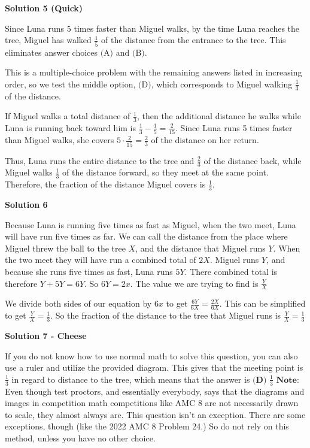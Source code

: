 \begin{enumerate}
 



\textbf{Solution 5 (Quick)}

Since Luna runs 5 times faster than Miguel walks, by the time Luna reaches the tree, Miguel has walked $\frac{1}{5}$ of the distance from the entrance to the tree. This eliminates answer choices $\text{(A)}$ and $\text{(B)}$.

 This is a multiple-choice problem with the remaining answers listed in increasing order, so we test the middle option, $\text{(D)}$, which corresponds to Miguel walking $\frac{1}{3}$ of the distance.

 If Miguel walks a total distance of $\frac{1}{3}$, then the additional distance he walks while Luna is running back toward him is $\frac{1}{3}-\frac{1}{5}=\frac{2}{15}$. Since Luna runs 5 times faster than Miguel walks, she covers $5\cdot\frac{2}{15}=\frac{2}{3}$ of the distance on her return.

 Thus, Luna runs the entire distance to the tree and $\frac{2}{3}$ of the distance back, while Miguel walks $\frac{1}{3}$ of the distance forward, so they meet at the same point. Therefore, the fraction of the distance Miguel covers is $\boxed{\frac{1}{3}}$.

 



\textbf{Solution 6}

Because Luna is running five times as fast as Miguel, when the two meet, Luna will have run five times as far. We can call the distance from the place where Miguel threw the ball to the tree $X$, and the distance that Miguel runs $Y$. When the two meet they will have run a combined total of $2X$. Miguel runs $Y$, and because she runs five times as fast, Luna runs $5Y$. There combined total is therefore $Y+5Y=6Y$. So $6Y=2x$. The value we are trying to find is $\frac{Y}{X}$

 We divide both sides of our equation by $6x$ to get $\frac{6Y}{6X}=\frac{2X}{6X}$. This can be simplified to get $\frac{Y}{X}=\frac{1}{3}$. So the fraction of the distance to the tree that Miguel runs is $\frac{Y}{X}=\boxed{\frac{1}{3}}$




\textbf{Solution 7 - Cheese }

If you do not know how to use normal math to solve this question, you can also use a ruler and utilize the provided diagram. This gives that the meeting point is $\frac{1}{3}$ in regard to distance to the tree, which means that the answer is $\boxed{ \textbf{(D) } \frac{1}{3}}$
$\textbf{Note:}$ Even though test proctors, and essentially everybody, says that the diagrams and images in competition math competitions like AMC 8 are not necessarily drawn to scale, they almost always are. This question isn’t an exception. There are some exceptions, though (like the 2022 AMC 8 Problem 24.) So do not rely on this method, unless you have no other choice.


\end{enumerate}
